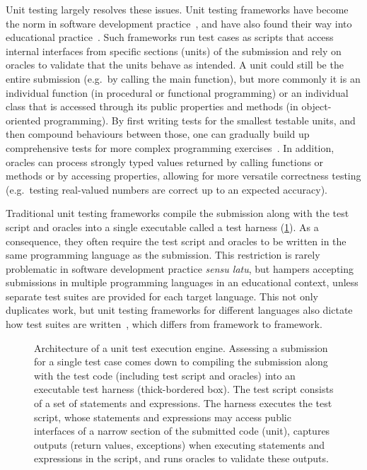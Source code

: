 \documentclass[../main]{subfiles}
\begin{document}
Unit testing largely resolves these issues.
Unit testing frameworks have become the norm in software development practice~\autocite{runesonSurveyUnitTesting2006}, and have also found their way into educational practice~\autocite{bettiniEnvironmentSelfassessingJava2004,ellsworthQuiverSystem2004}.
Such frameworks run test cases as scripts that access internal interfaces from specific sections (units) of the submission and rely on oracles to validate that the units behave as intended.
A unit could still be the entire submission (e.g.\ by calling the main function), but more commonly it is an individual function (in procedural or functional programming) or an individual class that is accessed through its public properties and methods (in object-oriented programming).
By first writing tests for the smallest testable units, and then compound behaviours between those, one can gradually build up comprehensive tests for more complex programming exercises~\autocite{panSoftwareTesting1999}.
In addition, oracles can process strongly typed values returned by calling functions or methods or by accessing properties, allowing for more versatile correctness testing (e.g.\ testing real-valued numbers are correct up to an expected accuracy).

Traditional unit testing frameworks compile the submission along with the test script and oracles into a single executable called a test harness (\cref{fig:unit-testing}).
As a consequence, they often require the test script and oracles to be written in the same programming language as the submission.
This restriction is rarely problematic in software development practice \emph{sensu latu}, but hampers accepting submissions in multiple programming languages in an educational context, unless separate test suites are provided for each target language.
This not only duplicates work, but unit testing frameworks for different languages also dictate how test suites are written~\autocite{agrawalSurveyGradingFormat2022,nayakAutomatedAssessmentTools2022}, which differs from framework to framework.

\begin{figure}
    \centering
    
    \caption{
        Architecture of a unit test execution engine.
        Assessing a submission for a single test case comes down to compiling the submission along with the test code (including test script and oracles) into an executable test harness (thick-bordered box).
        The test script consists of a set of statements and expressions.
        The harness executes the test script, whose statements and expressions may access public interfaces of a narrow section of the submitted code (unit), captures \textcolor{ugent-we}{outputs} (return values, exceptions) when executing statements and expressions in the script, and runs oracles to validate these outputs.
    }
    \label{fig:unit-testing}
\end{figure}
\end{document}
